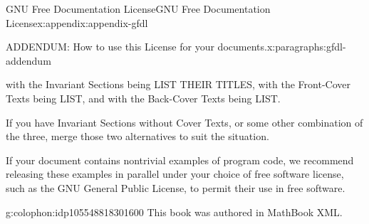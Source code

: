 \documentclass[twoside,10pt,]{book}
\newcommand{\xreffont}{\relax}
\numberwithin{equation}{part}
\providecommand\phantomsection{}
\begin{document}
\begin{appendixptx}{GNU Free Documentation License}{}{GNU Free Documentation License}{}{}{x:appendix:appendix-gfdl}
\begin{paragraphs}{ADDENDUM: How to use this License for your documents.}{x:paragraphs:gfdl-addendum}
\begin{preformatted}
with the Invariant Sections being LIST THEIR TITLES, with the
Front-Cover Texts being LIST, and with the Back-Cover Texts being LIST.
\end{preformatted}
If you have Invariant Sections without Cover Texts, or some other combination of the three, merge those two alternatives to suit the situation.%
\par
If your document contains nontrivial examples of program code, we recommend releasing these examples in parallel under your choice of free software license, such as the GNU General Public License, to permit their use in free software.%
\end{paragraphs}%
\end{appendixptx}
%
\backmatter%
%
\clearpage\phantomsection%
%
%
{\xreffont\printindex}
%
\cleardoublepage
\pagestyle{empty}
\begin{backcolophon}{g:colophon:idp105548818301600}%
This book was authored in MathBook XML.%
\end{backcolophon}%
\end{document}
